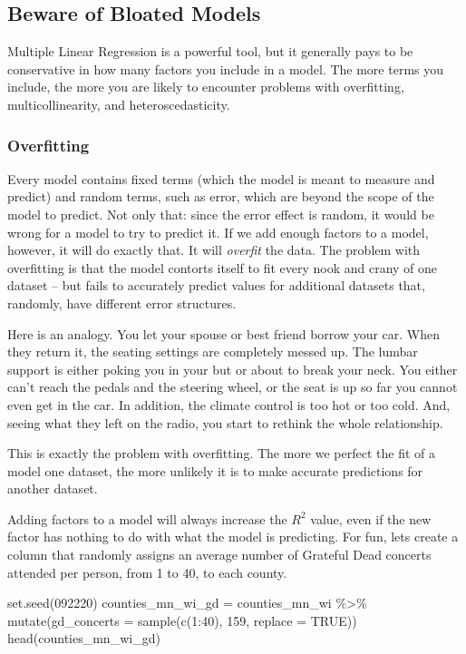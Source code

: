 \documentclass[
]{book}
\newenvironment{Shaded}{\begin{snugshade}}{\end{snugshade}}
\newcommand{\AttributeTok}[1]{\textcolor[rgb]{0.77,0.63,0.00}{#1}}
\newcommand{\ConstantTok}[1]{\textcolor[rgb]{0.00,0.00,0.00}{#1}}
\newcommand{\DecValTok}[1]{\textcolor[rgb]{0.00,0.00,0.81}{#1}}
\newcommand{\FunctionTok}[1]{\textcolor[rgb]{0.00,0.00,0.00}{#1}}
\newcommand{\NormalTok}[1]{#1}
\newcommand{\OtherTok}[1]{\textcolor[rgb]{0.56,0.35,0.01}{#1}}
\newcommand{\SpecialCharTok}[1]{\textcolor[rgb]{0.00,0.00,0.00}{#1}}
\begin{document}
\hypertarget{beware-of-bloated-models}{%
\subsection{Beware of Bloated Models}\label{beware-of-bloated-models}}

Multiple Linear Regression is a powerful tool, but it generally pays to be conservative in how many factors you include in a model. The more terms you include, the more you are likely to encounter problems with overfitting, multicollinearity, and heteroscedasticity.

\hypertarget{overfitting}{%
\subsubsection{Overfitting}\label{overfitting}}

Every model contains fixed terms (which the model is meant to measure and predict) and random terms, such as error, which are beyond the scope of the model to predict. Not only that: since the error effect is random, it would be wrong for a model to try to predict it. If we add enough factors to a model, however, it will do exactly that. It will \emph{overfit} the data. The problem with overfitting is that the model contorts itself to fit every nook and crany of one dataset -- but fails to accurately predict values for additional datasets that, randomly, have different error structures.

Here is an analogy. You let your spouse or best friend borrow your car. When they return it, the seating settings are completely messed up. The lumbar support is either poking you in your but or about to break your neck. You either can't reach the pedals and the steering wheel, or the seat is up so far you cannot even get in the car. In addition, the climate control is too hot or too cold. And, seeing what they left on the radio, you start to rethink the whole relationship.

This is exactly the problem with overfitting. The more we perfect the fit of a model one dataset, the more unlikely it is to make accurate predictions for another dataset.

Adding factors to a model will always increase the \(R^2\) value, even if the new factor has nothing to do with what the model is predicting. For fun, lets create a column that randomly assigns an average number of Grateful Dead concerts attended per person, from 1 to 40, to each county.

\begin{Shaded}
\begin{Highlighting}[]
\FunctionTok{set.seed}\NormalTok{(}\DecValTok{092220}\NormalTok{)}
\NormalTok{counties\_mn\_wi\_gd }\OtherTok{=}\NormalTok{ counties\_mn\_wi }\SpecialCharTok{\%\textgreater{}\%}
  \FunctionTok{mutate}\NormalTok{(}\AttributeTok{gd\_concerts =} \FunctionTok{sample}\NormalTok{(}\FunctionTok{c}\NormalTok{(}\DecValTok{1}\SpecialCharTok{:}\DecValTok{40}\NormalTok{), }\DecValTok{159}\NormalTok{, }\AttributeTok{replace =} \ConstantTok{TRUE}\NormalTok{))}
\FunctionTok{head}\NormalTok{(counties\_mn\_wi\_gd)}
\end{Highlighting}
\end{Shaded}
\end{document}
